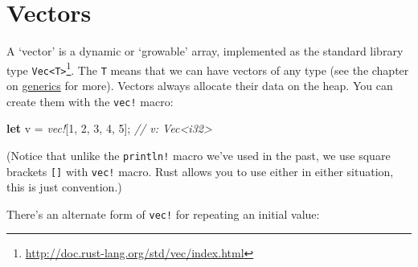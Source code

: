 \documentclass[a4paper,]{book}
\newenvironment{Shaded}{\begin{snugshade}}{\end{snugshade}}
\newcommand{\KeywordTok}[1]{\textcolor[rgb]{0.13,0.29,0.53}{\textbf{{#1}}}}
\newcommand{\DecValTok}[1]{\textcolor[rgb]{0.00,0.00,0.81}{{#1}}}
\newcommand{\StringTok}[1]{\textcolor[rgb]{0.31,0.60,0.02}{{#1}}}
\newcommand{\CommentTok}[1]{\textcolor[rgb]{0.56,0.35,0.01}{\textit{{#1}}}}
\newcommand{\OtherTok}[1]{\textcolor[rgb]{0.56,0.35,0.01}{{#1}}}
\newcommand{\PreprocessorTok}[1]{\textcolor[rgb]{0.56,0.35,0.01}{\textit{{#1}}}}
\newcommand{\NormalTok}[1]{{#1}}
\renewcommand{\href}[2]{#2\footnote{\url{#1}}}
\begin{document}
\begin{Shaded}
\end{Shaded}

\hypertarget{sec--vectors}{\section{Vectors}\label{sec--vectors}}

A `vector' is a dynamic or `growable' array, implemented as the standard
library type
\href{http://doc.rust-lang.org/std/vec/index.html}{\texttt{Vec\textless{}T\textgreater{}}}.
The \texttt{T} means that we can have vectors of any type (see the
chapter on \protect\hyperlink{sec--generics}{generics} for more).
Vectors always allocate their data on the heap. You can create them with
the \texttt{vec!} macro:

\begin{Shaded}
\begin{Highlighting}[]
\KeywordTok{let} \NormalTok{v = }\PreprocessorTok{vec!}\NormalTok{[}\DecValTok{1}\NormalTok{, }\DecValTok{2}\NormalTok{, }\DecValTok{3}\NormalTok{, }\DecValTok{4}\NormalTok{, }\DecValTok{5}\NormalTok{]; }\CommentTok{// v: Vec<i32>}
\end{Highlighting}
\end{Shaded}

(Notice that unlike the \texttt{println!} macro we've used in the past,
we use square brackets \texttt{{[}{]}} with \texttt{vec!} macro. Rust
allows you to use either in either situation, this is just convention.)

There's an alternate form of \texttt{vec!} for repeating an initial
value:
\end{document}
